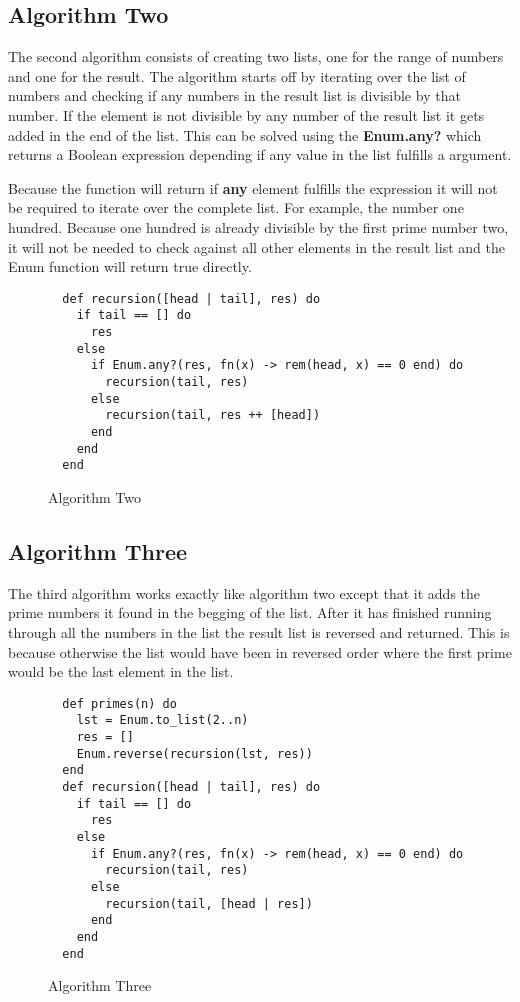 \documentclass[a4paper,11pt]{article}
\begin{document}
\subsection*{Algorithm Two}
The second algorithm consists of creating two lists, one for the range of numbers and one for the result. The algorithm starts off by iterating over the list of numbers and checking if any numbers in the result list is divisible by that number. If the element is not divisible by any number of the result list it gets added in the end of the list. This can be solved using the \textbf{Enum.any?} which returns a Boolean expression depending if any value in the list fulfills a argument.

Because the function will return if \textbf{any} element fulfills the expression it will not be required to iterate over the complete list. For example, the number one hundred. Because one hundred is already divisible by the first prime number two, it will not be needed to check against all other elements in the result list and the Enum function will return true directly.

\begin{figure}[H]
\begin{verbatim}
  def recursion([head | tail], res) do
    if tail == [] do
      res
    else
      if Enum.any?(res, fn(x) -> rem(head, x) == 0 end) do
        recursion(tail, res)
      else
        recursion(tail, res ++ [head])
      end
    end
  end
\end{verbatim}
\caption{Algorithm Two}
\label{Figure:2}
\end{figure}

\subsection*{Algorithm Three}
The third algorithm works exactly like algorithm two except that it adds the prime numbers it found in the begging of the list. After it has finished running through all the numbers in the list the result list is reversed and returned. This is because otherwise the list would have been in reversed order where the first prime would be the last element in the list.

\begin{figure}[H]
\begin{verbatim}
  def primes(n) do
    lst = Enum.to_list(2..n)
    res = []
    Enum.reverse(recursion(lst, res))
  end
  def recursion([head | tail], res) do
    if tail == [] do
      res
    else
      if Enum.any?(res, fn(x) -> rem(head, x) == 0 end) do
        recursion(tail, res)
      else
        recursion(tail, [head | res])
      end
    end
  end
\end{verbatim}
\caption{Algorithm Three}
\label{Figure:3}
\end{figure}
\end{document}
